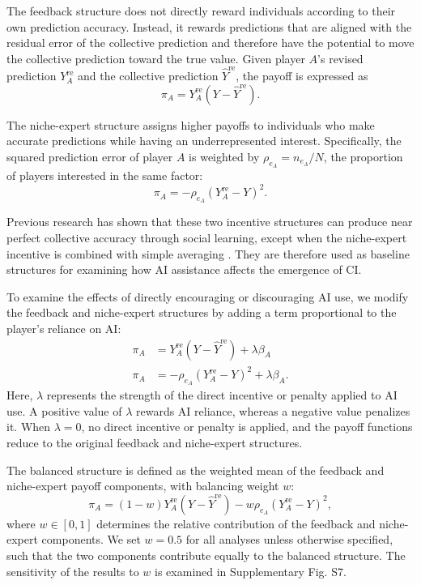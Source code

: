 \documentclass[12pt]{article}
\begin{document}
The feedback structure does not directly reward individuals according to their own prediction accuracy. Instead, it rewards predictions that are aligned with the residual error of the collective prediction and therefore have the potential to move the collective prediction toward the true value. Given player $A$'s revised prediction $Y_A^{\mathrm{re}}$ and the collective prediction $\hat{Y}^{\mathrm{re}}$, the payoff is expressed as
\begin{equation}
\pi_A = Y_A^{\mathrm{re}}(Y-\hat{Y}^{\mathrm{re}}).
\end{equation}

The niche-expert structure assigns higher payoffs to individuals who make accurate predictions while having an underrepresented interest. Specifically, the squared prediction error of player $A$ is weighted by $\rho_{e_A}=n_{e_A}/N$, the proportion of players interested in the same factor:
\begin{equation}
\pi_A = -\rho_{e_A}(Y_A^{\mathrm{re}}-Y)^2.
\end{equation}

Previous research has shown that these two incentive structures can produce near perfect collective accuracy through social learning, except when the niche-expert incentive is combined with simple averaging \citep{wang2025individual}. They are therefore used as baseline structures for examining how AI assistance affects the emergence of CI.

To examine the effects of directly encouraging or discouraging AI use, we modify the feedback and niche-expert structures by adding a term proportional to the player's reliance on AI:
\begin{align}
\pi_A &= Y_A^{\mathrm{re}}(Y-\hat{Y}^{\mathrm{re}}) + \lambda\beta_A\\
\pi_A &= -\rho_{e_A}(Y_A^{\mathrm{re}}-Y)^2 + \lambda\beta_A.
\end{align}
Here, $\lambda$ represents the strength of the direct incentive or penalty applied to AI use. A positive value of $\lambda$ rewards AI reliance, whereas a negative value penalizes it. When $\lambda=0$, no direct incentive or penalty is applied, and the payoff functions reduce to the original feedback and niche-expert structures.

The balanced structure is defined as the weighted mean of the feedback and niche-expert payoff components, with balancing weight $w$:
\begin{equation}
\pi_A = (1-w){Y_A^{\mathrm{re}}(Y-\hat{Y}^{\mathrm{re}})} - w\rho_{e_A}(Y_A^{\mathrm{re}}-Y)^2,
\end{equation}
where $w \in [0,1]$ determines the relative contribution of the feedback and niche-expert components.
We set $w=0.5$ for all analyses unless otherwise specified, such that the two components contribute equally to the balanced structure.
The sensitivity of the results to $w$ is examined in Supplementary Fig. S7.
\end{document}
